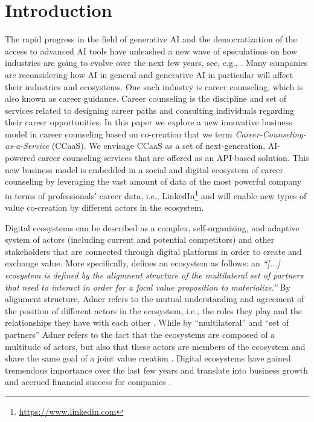 \section{Introduction}
\label{sec:introduction}

The rapid progress in the field of generative AI and the democratization of the access to advanced AI tools have
unleashed a new wave of speculations on how industries are going to evolve over the next few years, see, e.g.,
\cite{chuiHowGenerativeAI2022,chuiWhatEveryCEO2023}. Many companies are reconsidering how 
AI in general and generative AI in particular will affect their industries and ecosystems. One such industry is
career counseling, which is also known as career guidance. Career counseling is the discipline and set of services
related to designing career paths and consulting individuals regarding their career opportunities.
In this paper we explore a new innovative business model in career counseling based on co-creation that we term
\textit{Career-Counseling-as-a-Service} (CCaaS). We envisage CCaaS as a set of next-generation, AI-powered career
counseling services that are offered as an API-based solution. This new business model is embedded in a social and
digital ecosystem of career counseling by leveraging the vast amount of data of the most powerful company in terms
of professionals' career data, i.e., LinkedIn\footnote[1]{\url{https://www.linkedin.com}} and will enable new types
of value co-creation by different actors in the ecosystem.

Digital ecosystems can be described as a complex, self-organizing, and adaptive system of actors (including current and
potential competitors) and other stakeholders that are connected through digital platforms in order to create and exchange
value. More specifically, \cite{adnerEcosystemStructureActionable2017} defines an ecosystem as follows: an \textit{``[...]
ecosystem is defined by the alignment structure of the multilateral set of partners that need to interact in order for a
focal value proposition to materialize.''} By alignment structure, Adner refers to the mutual understanding and agreement
of the position of different actors in the ecosystem, i.e., the roles they play and the relationships they have with each other
\citep[p. 42]{adnerEcosystemStructureActionable2017}. While by ``multilateral'' and ``set of partners'' Adner refers to
the fact that the ecosystems are composed of a multitude of actors, but also that these actors are members of the ecosystem
and share the same goal of a joint value creation \citep[p. 42-43]{adnerEcosystemStructureActionable2017}. Digital ecosystems
have gained tremendous importance over the last few years and translate into business growth and accrued financial success
for companies \citep{weillThrivingIncreasinglyDigital2015}.

